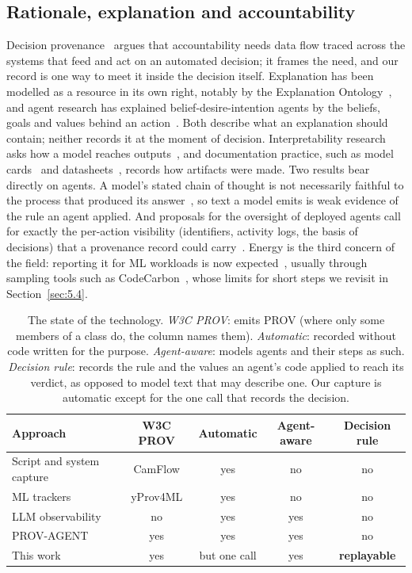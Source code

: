 \documentclass[conference]{IEEEtran}
\begin{document}
\subsection{Rationale, explanation and accountability}\label{sec:2.3}

\noindent Decision provenance~\cite{singh2019} argues that accountability needs data flow traced across the systems that feed and act on an automated decision; it frames the need, and our record is one way to meet it inside the decision itself. Explanation has been modelled as a resource in its own right, notably by the Explanation Ontology~\cite{chari2020}, and agent research has explained belief-desire-intention agents by the beliefs, goals and values behind an action~\cite{winikoff2022}. Both describe what an explanation should contain; neither records it at the moment of decision. Interpretability research asks how a model reaches outputs~\cite{doshivelez2017}, and documentation practice, such as model cards~\cite{modelcards} and datasheets~\cite{datasheets}, records how artifacts were made. Two results bear directly on agents. A model's stated chain of thought is not necessarily faithful to the process that produced its answer~\cite{turpin2023,lanham2023}, so text a model emits is weak evidence of the rule an agent applied. And proposals for the oversight of deployed agents call for exactly the per-action visibility (identifiers, activity logs, the basis of decisions) that a provenance record could carry~\cite{chan2024}. Energy is the third concern of the field: reporting it for ML workloads is now expected~\cite{strubell2019,henderson2020}, usually through sampling tools such as CodeCarbon~\cite{codecarbon}, whose limits for short steps we revisit in Section~\ref{sec:5.4}.

\begin{table}[t]
\centering\footnotesize
\caption{The state of the technology. \emph{W3C PROV}: emits PROV (where only some members of a class do, the column names them). \emph{Automatic}: recorded without code written for the purpose. \emph{Agent-aware}: models agents and their steps as such. \emph{Decision rule}: records the rule and the values an agent's code applied to reach its verdict, as opposed to model text that may describe one. Our capture is automatic except for the one call that records the decision.}\label{tab:1}
\begin{tabularx}{\columnwidth}{Lcccc}
\toprule
Approach & W3C PROV & Automatic & Agent-aware & Decision rule \\
\midrule
Script and system capture~\cite{noworkflow,spade,camflow} & CamFlow & yes & no & no \\
ML trackers~\cite{mlflow,yprov4ml} & yProv4ML & yes & no & no \\
LLM observability~\cite{otelgenai,langsmith} & no & yes & yes & no \\
PROV-AGENT~\cite{provagent} & yes & yes & yes & no \\
This work & yes & but one call & yes & \textbf{replayable} \\
\bottomrule
\end{tabularx}
\end{table}
\end{document}
